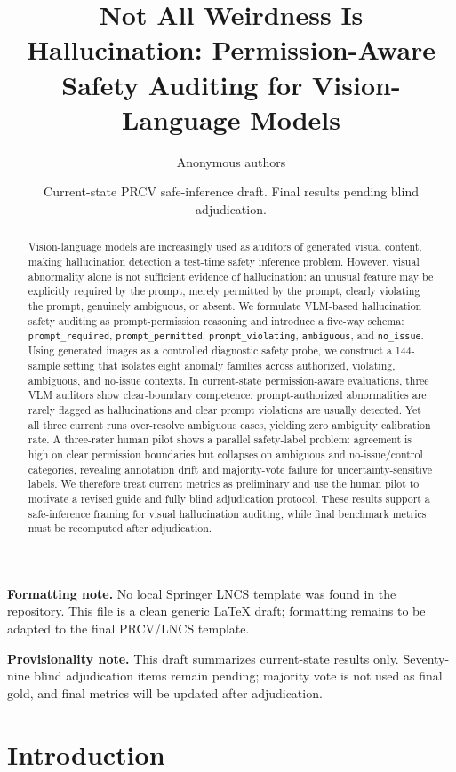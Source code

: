 \documentclass[11pt]{article}
\title{Not All Weirdness Is Hallucination: Permission-Aware Safety Auditing for Vision-Language Models}
\author{Anonymous authors}
\date{Current-state PRCV safe-inference draft. Final results pending blind adjudication.}
\begin{document}
\maketitle

\noindent\textbf{Formatting note.} No local Springer LNCS template was found in the repository. This file is a clean generic LaTeX draft; formatting remains to be adapted to the final PRCV/LNCS template.

\begin{abstract}
Vision-language models are increasingly used as auditors of generated visual content, making hallucination detection a test-time safety inference problem. However, visual abnormality alone is not sufficient evidence of hallucination: an unusual feature may be explicitly required by the prompt, merely permitted by the prompt, clearly violating the prompt, genuinely ambiguous, or absent. We formulate VLM-based hallucination safety auditing as prompt-permission reasoning and introduce a five-way schema: \texttt{prompt\_required}, \texttt{prompt\_permitted}, \texttt{prompt\_violating}, \texttt{ambiguous}, and \texttt{no\_issue}. Using generated images as a controlled diagnostic safety probe, we construct a 144-sample setting that isolates eight anomaly families across authorized, violating, ambiguous, and no-issue contexts. In current-state permission-aware evaluations, three VLM auditors show clear-boundary competence: prompt-authorized abnormalities are rarely flagged as hallucinations and clear prompt violations are usually detected. Yet all three current runs over-resolve ambiguous cases, yielding zero ambiguity calibration rate. A three-rater human pilot shows a parallel safety-label problem: agreement is high on clear permission boundaries but collapses on ambiguous and no-issue/control categories, revealing annotation drift and majority-vote failure for uncertainty-sensitive labels. We therefore treat current metrics as preliminary and use the human pilot to motivate a revised guide and fully blind adjudication protocol. These results support a safe-inference framing for visual hallucination auditing, while final benchmark metrics must be recomputed after adjudication.
\end{abstract}

\noindent\textbf{Provisionality note.} This draft summarizes current-state results only. Seventy-nine blind adjudication items remain pending; majority vote is not used as final gold, and final metrics will be updated after adjudication.

\section{Introduction}
\end{document}
